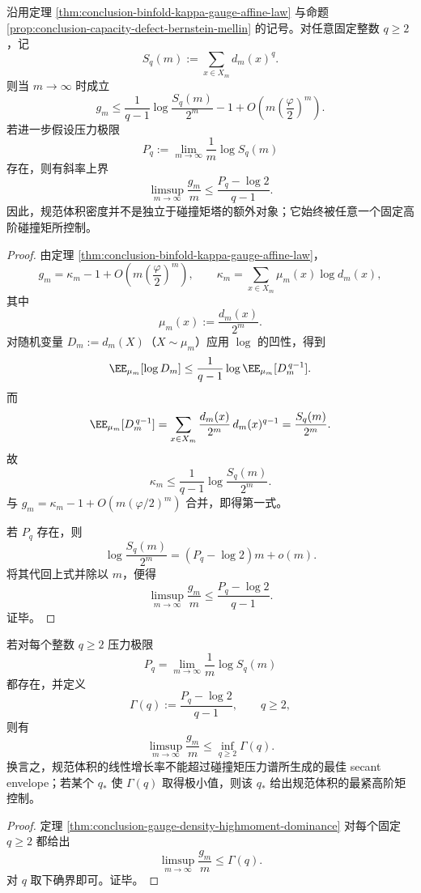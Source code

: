 \begin{theorem}[规范体积密度的高阶碰撞矩支配律]\label{thm:conclusion-gauge-density-highmoment-dominance}
沿用定理 \ref{thm:conclusion-binfold-kappa-gauge-affine-law} 与命题 \ref{prop:conclusion-capacity-defect-bernstein-mellin} 的记号。对任意固定整数 \(q\ge 2\)，记
\[
S_q(m):=\sum_{x\in X_m}d_m(x)^q.
\]
则当 \(m\to\infty\) 时成立
\[
g_m
\le
\frac{1}{q-1}\log\frac{S_q(m)}{2^m}-1
+O\!\left(m\left(\frac{\varphi}{2}\right)^m\right).
\]
若进一步假设压力极限
\[
P_q:=\lim_{m\to\infty}\frac1m\log S_q(m)
\]
存在，则有斜率上界
\[
\limsup_{m\to\infty}\frac{g_m}{m}
\le
\frac{P_q-\log 2}{q-1}.
\]
因此，规范体积密度并不是独立于碰撞矩塔的额外对象；它始终被任意一个固定高阶碰撞矩所控制。
\end{theorem}
\begin{proof}
由定理 \ref{thm:conclusion-binfold-kappa-gauge-affine-law}，
\[
g_m=\kappa_m-1+O\!\left(m\left(\frac{\varphi}{2}\right)^m\right),
\qquad
\kappa_m=\sum_{x\in X_m}\mu_m(x)\log d_m(x),
\]
其中
\[
\mu_m(x):=\frac{d_m(x)}{2^m}.
\]
对随机变量 \(D_m:=d_m(X)\)（\(X\sim\mu_m\)）应用 \(\log\) 的凹性，得到
\[
\EE_{\mu_m}[\log D_m]
\le
\frac{1}{q-1}\log \EE_{\mu_m}[D_m^{\,q-1}].
\]
而
\[
\EE_{\mu_m}[D_m^{\,q-1}]
=
\sum_{x\in X_m}\frac{d_m(x)}{2^m}\,d_m(x)^{q-1}
=
\frac{S_q(m)}{2^m}.
\]
故
\[
\kappa_m\le \frac{1}{q-1}\log\frac{S_q(m)}{2^m}.
\]
与 \(g_m=\kappa_m-1+O(m(\varphi/2)^m)\) 合并，即得第一式。

若 \(P_q\) 存在，则
\[
\log\frac{S_q(m)}{2^m}
=(P_q-\log 2)m+o(m).
\]
将其代回上式并除以 \(m\)，便得
\[
\limsup_{m\to\infty}\frac{g_m}{m}
\le
\frac{P_q-\log 2}{q-1}.
\]
证毕。
\end{proof}

\begin{corollary}[规范体积的压力上包络原理]\label{cor:conclusion-gauge-density-pressure-envelope}
若对每个整数 \(q\ge 2\) 压力极限
\[
P_q=\lim_{m\to\infty}\frac1m\log S_q(m)
\]
都存在，并定义
\[
\Gamma(q):=\frac{P_q-\log 2}{q-1},
\qquad q\ge 2,
\]
则有
\[
\limsup_{m\to\infty}\frac{g_m}{m}
\le
\inf_{q\ge 2}\Gamma(q).
\]
换言之，规范体积的线性增长率不能超过碰撞矩压力谱所生成的最佳 secant envelope；若某个 \(q_\ast\) 使 \(\Gamma(q)\) 取得极小值，则该 \(q_\ast\) 给出规范体积的最紧高阶矩控制。
\end{corollary}
\begin{proof}
定理 \ref{thm:conclusion-gauge-density-highmoment-dominance} 对每个固定 \(q\ge 2\) 都给出
\[
\limsup_{m\to\infty}\frac{g_m}{m}\le \Gamma(q).
\]
对 \(q\) 取下确界即可。证毕。
\end{proof}

